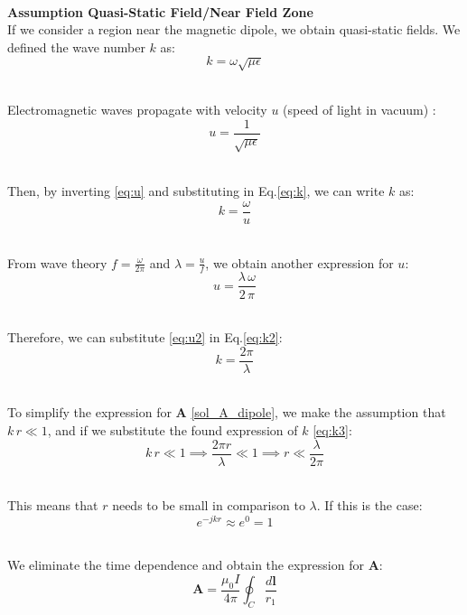 \documentclass[main]{subfiles}
\begin{document}
\noindent\\
\textbf{Assumption Quasi-Static Field/Near Field Zone}\noindent\\
If we consider a region near the magnetic dipole, we 
obtain quasi-static fields. We defined the wave number 
$k$ as:
\begin{equation}
 k = \omega \sqrt{\mu \epsilon}
    \label{eq:k}
\end{equation}

\noindent\\
Electromagnetic waves propagate with velocity $u$ 
(speed of light in vacuum) \cite{book-magnetism}:
\begin{equation}
 u = \frac{1}{\sqrt{\mu \epsilon}}
    \label{eq:u}
\end{equation}

\noindent\\
Then, by inverting \ref{eq:u} and substituting in 
Eq.\ref{eq:k}, we can write $k$ as:
\begin{equation}
 k = \frac{\omega}{u}
    \label{eq:k2}
\end{equation}

\noindent\\
From wave theory $f = \frac{\omega}{2\pi}$ and 
$\lambda = \frac{u}{f}$, we obtain another expression 
for $u$:
\begin{equation}
 u = \frac{\lambda \, \omega}{2 \, \pi}
\end{equation}
\label{eq:u2}

\noindent\\ 
Therefore, we can substitute \ref{eq:u2} in 
Eq.\ref{eq:k2}:
\begin{equation}
 k = \frac{2 \pi}{\lambda}
    \label{eq:k3}
\end{equation}

\noindent\\
To simplify the expression for $\mathbf{A}$ 
\eqref{sol_A_dipole}, we make the assumption that 
$k \, r \ll 1$, and if we substitute the found 
expression of $k$ \eqref{eq:k3}:
\[
 k \, r \ll 1 \implies \frac{2\pi r}{\lambda} 
    \ll 1 \implies r \ll \frac{\lambda}{2\pi}
\]

\noindent\\
This means that $r$ needs to be small in comparison 
to $\lambda$. If this is the case:
\[
 e^{-j k r} \approx e^0 = 1
\]

\noindent\\
We eliminate the time dependence and 
obtain the expression for $\mathbf{A}$:
\begin{equation}
 \mathbf{A} = \frac{\mu_0 I}{4\pi} \oint_C 
 \frac{d\mathbf{l}}{r_1}
    \label{A_approx}
\end{equation}
\end{document}

